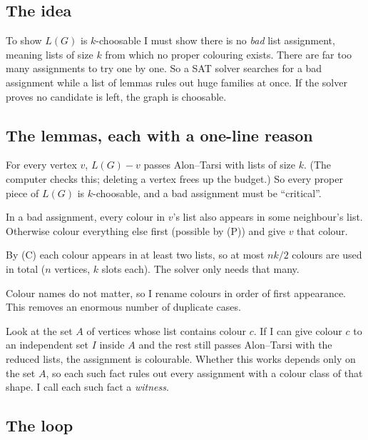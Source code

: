 \documentclass[11pt]{article}
\theoremstyle{plain}
\theoremstyle{definition}
\begin{document}
\subsection{The idea}

To show $L(G)$ is $k$-choosable I must show there is no \emph{bad} list assignment, meaning lists
of size $k$ from which no proper colouring exists. There are far too many assignments to try
one by one. So a SAT solver searches for a bad assignment while a list of lemmas rules out huge
families at once. If the solver proves no candidate is left, the graph is choosable.

\subsection{The lemmas, each with a one-line reason}

\begin{description}[leftmargin=1.5em,style=nextline]
  \item[(P) Precheck] For every vertex $v$, $L(G) - v$ passes Alon--Tarsi with lists of size $k$.
        (The computer checks this; deleting a vertex frees up the budget.) So every proper
        piece of $L(G)$ is $k$-choosable, and a bad assignment must be ``critical''.
  \item[(C) Criticality] In a bad assignment, every colour in $v$'s list also appears in some
        neighbour's list. Otherwise colour everything else first (possible by (P)) and give
        $v$ that colour.
  \item[(B) Palette] By (C) each colour appears in at least two lists, so at most $nk/2$
        colours are used in total ($n$ vertices, $k$ slots each). The solver only needs that many.
  \item[(S) Symmetry] Colour names do not matter, so I rename colours in order of first
        appearance. This removes an enormous number of duplicate cases.
  \item[(R) Reducible colour classes] Look at the set $A$ of vertices whose list contains colour
        $c$. If I can give colour $c$ to an independent set $I$ inside $A$ and the rest still
        passes Alon--Tarsi with the reduced lists, the assignment is colourable. Whether this
        works depends only on the set $A$, so each such fact rules out every assignment with a
        colour class of that shape. I call each such fact a \emph{witness}.
\end{description}

\subsection{The loop}
\end{document}
